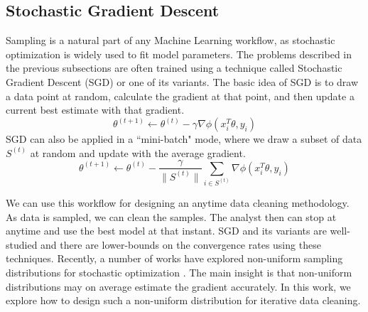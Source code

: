 \subsection{Stochastic Gradient Descent}
Sampling is a natural part of any Machine Learning workflow, as stochastic optimization is widely used to fit model parameters.
The problems described in the previous subsections are often trained using a technique called Stochastic Gradient Descent (SGD) or one of its variants.
The basic idea of SGD is to draw a data point at random, calculate the gradient at that point, and then update a current best estimate with that gradient.
\[
\theta^{(t+1)}\leftarrow\theta^{(t)}-\gamma\nabla\phi(x_{i}^T\theta,y_{i})
\]
 SGD can also be applied in a ``mini-batch" mode, where we draw a subset of data $S^{(t)}$ at random and update with the average gradient.
 \[
 \theta^{(t+1)}\leftarrow\theta^{(t)}-\frac{\gamma}{\|S^{(t)}\|}\sum_{i\in S^{(t)}}\nabla\phi(x_{i}^T\theta,y_{i})
 \]

We can use this workflow for designing an anytime data cleaning methodology.
As data is sampled, we can clean the samples.
The analyst then can stop at anytime and use the best model at that instant.
SGD and its variants are well-studied and there are lower-bounds on the convergence rates using these techniques. 
Recently, a number of works have explored non-uniform sampling distributions for stochastic optimization \cite{zhao2014stochastic, qu2014randomized}.
The main insight is that non-uniform distributions may on average estimate the gradient accurately.
In this work, we explore how to design such a non-uniform distribution for iterative data cleaning.

\fi


 
